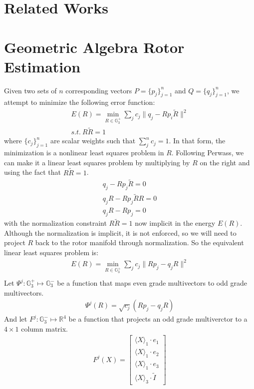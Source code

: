 \documentclass{birkjour}
\numberwithin{equation}{section}
\begin{document}
\section{Related Works}

\section{Geometric Algebra Rotor Estimation}

Given two sets of $n$ corresponding vectors $P = \{p_j\}_{j=1}^n$ and $Q = \{q_j\}_{j=1}^n$, we attempt to minimize the following error function:
\begin{eqnarray*}
E(R) = \min_{R \in \mathbb{G}^{+}_3 } \sum_j { c_{j} \|q_j - R p_i \tilde R\|^2 }\\
s.t. \ R \tilde R = 1
\end{eqnarray*}
where $\{c_{j}\}_{j=1}^n$ are scalar weights such that $\sum_j^n{c_j} = 1$. In that form, the minimization is a nonlinear least squares problem in $R$. Following Perwass, we can make it a linear least squares problem by multiplying by $R$ on the right and using the fact that $R \tilde R = 1$.
\begin{eqnarray*}
q_j - R p_j \tilde R = 0\\
q_j R - R p_j \tilde R R = 0\\
q_j R - R p_j = 0
\end{eqnarray*}
with the normalization constraint $R \tilde R = 1$ now implicit in the energy $E(R)$. Although the normalization is implicit, it is not enforced, so we will need to project $R$ back to the rotor manifold through normalization. So the equivalent linear least squares problem is:
\begin{eqnarray*}
E(R) = \min_{R \in \mathbb{G}^{+}_3 } \sum_j { c_{j} \|R p_j - q_j R\|^2 }\\
\end{eqnarray*}
Let $\Psi^j : \mathbb{G}^{+}_3 \mapsto \mathbb{G}^{-}_3$ be a function that maps even grade multivectors to odd grade multivectors. 
\begin{eqnarray*}
\Psi^j(R) = \sqrt{c_{j}} (R p_j - q_j R)
\end{eqnarray*}
And let $F^j : \mathbb{G}^{-}_3 \mapsto \mathbb{R}^4$ be a function that projects an odd grade multiverctor to a $4\times1$ column matrix.
\begin{eqnarray*}
F^j(X) = \left[\begin{array}{c} \langle X \rangle_1 \cdot e_1 \\ \langle X \rangle_1 \cdot e_2 \\ \langle X \rangle_1 \cdot e_3 \\ \langle X \rangle_3 \cdot \tilde I \end{array}\right]
\end{eqnarray*}
\end{document}
